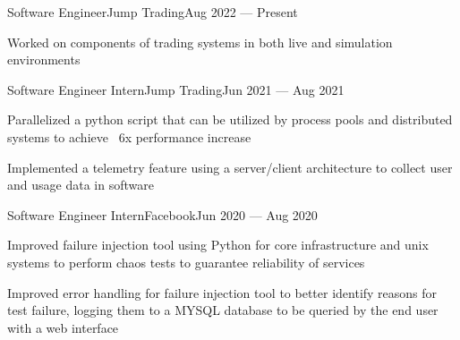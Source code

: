 \documentclass{resume}
\begin{document}
\begin{experience}
    \begin{entry}{Software Engineer}{Jump Trading}{Aug 2022 --- Present}
        \begin{description}
            \item Worked on components of trading systems in both live and
                simulation environments
        \end{description}
    \end{entry}
    \begin{entry}{Software Engineer Intern}{Jump Trading}{Jun 2021 --- Aug 2021}
        \begin{description}
            \item Parallelized a python script that can be utilized by process
                pools and distributed systems to achieve ~6x performance increase
            \item Implemented a telemetry feature using a server/client
                architecture to collect user and usage data in software
        \end{description}
    \end{entry}
    \begin{entry}{Software Engineer Intern}{Facebook}{Jun 2020 --- Aug 2020}
        \begin{description}
            \item Improved failure injection tool using Python for core
                infrastructure and unix systems to perform chaos tests to
                guarantee reliability of services
            \item Improved error handling for failure injection tool to better
                identify reasons for test failure, logging them to a MYSQL
                database to be queried by the end user with a web interface
        \end{description}
    \end{entry}


\end{experience}
\end{document}
